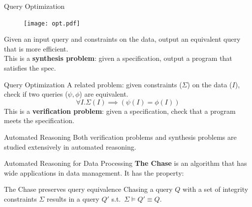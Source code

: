 \documentclass{beamer}
\begin{document}
  \begin{frame}{Query Optimization}
    \begin{figure}
      \texttt{[image: opt.pdf]}
    \end{figure}
    Given an input query and constraints on the data, 
    output an equivalent query that is more efficient. \pause \\
    This is a \textbf{synthesis problem}: given a specification,
    output a program that satisfies the spec.
  \end{frame}

  \begin{frame}{Query Optimization}
    A related problem: given constraints ($\Sigma$) on the data ($I$), 
    check if two queries ($\psi, \phi$) are equivalent.
    \[\forall I . \Sigma(I) \implies (\psi(I) = \phi(I)) \] \pause
    This is a \textbf{verification problem}:
    given a specification, check that a program meets the specification.
  \end{frame}

  \begin{frame}{Automated Reasoning}
    Both verification problems and synthesis problems are studied 
    extensively in automated reasoning.
  \end{frame}

  \begin{frame}{Automated Reasoning for Data Processing}
    \textbf{The Chase} is an algorithm that has wide applications 
    in data management. It has the property:
    \begin{alertblock}{The Chase preserves query equivalence}
      Chasing a query $Q$ with a set of integrity constraints $\Sigma$
      results in a query $Q'$ s.t.~$\Sigma \models Q'\equiv Q$.
    \end{alertblock}
  \end{frame}
\end{document}
